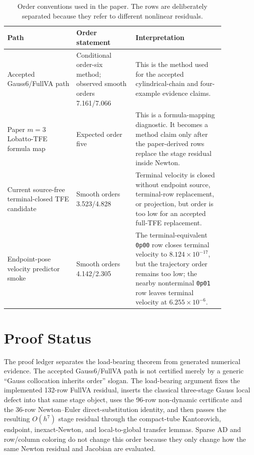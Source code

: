 \documentclass[11pt]{article}
\newcommand{\method}{Gauss6/FullVA}
\newcommand{\tfe}{TFE}
\begin{document}
\begin{table}[t]
\centering
\caption{Order conventions used in the paper.  The rows are deliberately
separated because they refer to different nonlinear residuals.}
\label{tab:order-conventions}
\begin{tabular}{P{0.28\linewidth}P{0.24\linewidth}P{0.36\linewidth}}
\toprule
Path & Order statement & Interpretation \\
\midrule
Accepted \method{} path &
Conditional order-six method; observed smooth orders 7.161/7.066 &
This is the method used for the accepted cylindrical-chain and four-example
evidence claims. \\
Paper $m=3$ Lobatto-\tfe{} formula map &
Expected order five &
This is a formula-mapping diagnostic.  It becomes a method claim only after the
paper-derived rows replace the stage residual inside Newton. \\
Current source-free terminal-closed \tfe{} candidate &
Smooth orders 3.523/4.828 &
Terminal velocity is closed without endpoint source, terminal-row replacement,
or projection, but order is too low for an accepted full-\tfe{} replacement. \\
Endpoint-pose velocity predictor smoke &
Smooth orders 4.142/2.305 &
The terminal-equivalent \nolinkurl{0p00} row closes terminal velocity to
$8.124\times10^{-17}$, but the trajectory order remains too low; the nearby
nonterminal \nolinkurl{0p01} row leaves terminal velocity at
$6.255\times10^{-6}$. \\
\bottomrule
\end{tabular}
\end{table}

\section{Proof Status}

The proof ledger separates the load-bearing theorem from generated numerical
evidence.  The accepted \method{} path is not certified merely by a generic
``Gauss collocation inherits order'' slogan.  The load-bearing argument fixes
the implemented 132-row FullVA residual, inserts the classical three-stage
Gauss local defect into that same stage object, uses the 96-row non-dynamic
certificate and the 36-row Newton--Euler direct-substitution identity, and then
passes the resulting \(O(h^7)\) stage residual through the compact-tube
Kantorovich, endpoint, inexact-Newton, and local-to-global transfer lemmas.
Sparse AD and row/column coloring do not change this order because they only
change how the same Newton residual and Jacobian are evaluated.
\end{document}
